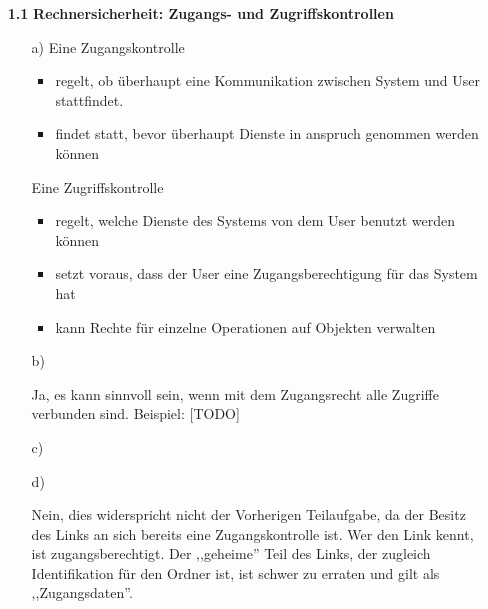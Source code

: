 \documentclass[a4paper,11pt]{article}
\author{\authorinfo}
\title{\titleinfo}
\date{\today}
\begin{document}
\maketitle


\begin{enumerate}
\item[\textbf{1.1}]
    \textbf{Rechnersicherheit: Zugangs- und Zugriffskontrollen}
    \begin{enumerate}
        \item[a)]
            Eine Zugangskontrolle

            \begin{itemize}
                \item regelt, ob überhaupt eine Kommunikation zwischen System und User
                stattfindet.
                \item findet statt, bevor überhaupt Dienste in anspruch genommen werden können
            \end{itemize}

            Eine Zugriffskontrolle

            \begin{itemize}
                \item regelt, welche Dienste des Systems von dem User benutzt werden können
                \item setzt voraus, dass der User eine Zugangsberechtigung für das System hat
                \item kann Rechte für einzelne Operationen auf Objekten verwalten
            \end{itemize}

        \item[b)]

            Ja, es kann sinnvoll sein, wenn mit dem Zugangsrecht alle Zugriffe verbunden sind. Beispiel: [TODO]

        \item[c)]
        \item[d)]

            Nein, dies widerspricht nicht der Vorherigen Teilaufgabe, da der Besitz des Links an sich bereits eine Zugangskontrolle ist. Wer den Link kennt, ist zugangsberechtigt. Der ,,geheime'' Teil des Links, der zugleich Identifikation für den Ordner ist, ist schwer zu erraten und gilt als ,,Zugangsdaten''.



    \end{enumerate}


\end{enumerate}
\end{document}
